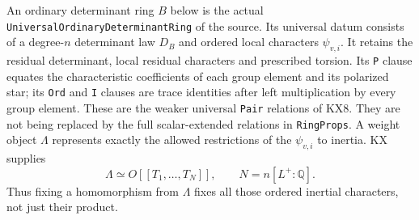 An ordinary determinant ring $B$ below is the actual
\texttt{UniversalOrdinaryDeterminantRing} of the source.  Its
universal datum consists of a degree-$n$ determinant law $D_B$ and
ordered local characters $\psi_{v,i}$.  It retains the residual
determinant, local residual characters and prescribed torsion.
Its \texttt{P} clause equates the characteristic coefficients of
each group element and its polarized star; its \texttt{Ord} and
\texttt{I} clauses are trace identities after left multiplication
by every group element.  These are the weaker universal
\texttt{Pair} relations of KX8.  They are not being replaced by
the full scalar-extended relations in \texttt{RingProps}.  A weight object
$\Lambda$ represents exactly the allowed restrictions of the
$\psi_{v,i}$ to inertia.  KX supplies
\[
       \Lambda\simeq O[[T_1,\ldots,T_N]],
       \qquad N=n[L^+:\mathbb Q].
       \tag{QX.4}
\]
Thus fixing a homomorphism from $\Lambda$ fixes all those ordered
inertial characters, not just their product.


